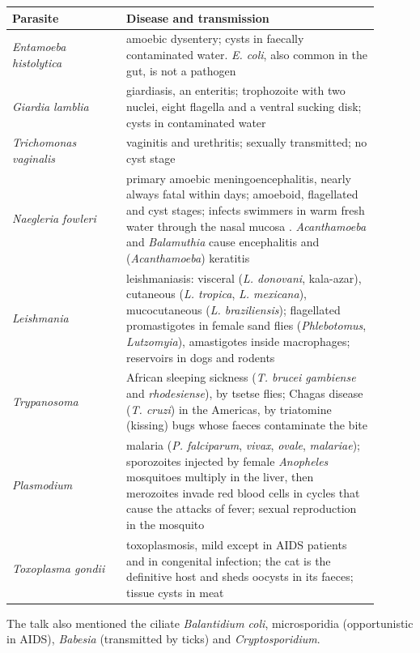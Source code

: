 \begin{center}
\begin{tabular}{p{0.28\linewidth}
p{0.62\linewidth}}
Parasite & Disease and transmission \\
\hline
\emph{Entamoeba histolytica} & amoebic
dysentery; cysts in faecally contaminated
water. \emph{E. coli}, also common in the
gut, is not a pathogen \\
\emph{Giardia lamblia} & giardiasis, an
enteritis; trophozoite with two nuclei, eight
flagella and a ventral sucking disk; cysts in
contaminated water \\
\emph{Trichomonas vaginalis} & vaginitis and
urethritis; sexually transmitted; no cyst
stage \\
\emph{Naegleria fowleri} & primary amoebic
meningoencephalitis, nearly always fatal
within days; amoeboid, flagellated and cyst
stages; infects swimmers in warm fresh water
through the nasal mucosa \cite[Chapter
22]{tortora2013microbiology}.
\emph{Acanthamoeba} and \emph{Balamuthia}
cause encephalitis and (\emph{Acanthamoeba})
keratitis \\
\emph{Leishmania} & leishmaniasis: visceral
(\emph{L. donovani}, kala-azar), cutaneous
(\emph{L. tropica}, \emph{L. mexicana}),
mucocutaneous (\emph{L. braziliensis});
flagellated promastigotes in female sand
flies (\emph{Phlebotomus}, \emph{Lutzomyia}),
amastigotes inside macrophages; reservoirs in
dogs and rodents \\
\emph{Trypanosoma} & African sleeping
sickness (\emph{T. brucei gambiense} and
\emph{rhodesiense}), by tsetse flies; Chagas
disease (\emph{T. cruzi}) in the Americas, by
triatomine (kissing) bugs whose faeces
contaminate the bite \\
\emph{Plasmodium} & malaria (\emph{P.
falciparum}, \emph{vivax}, \emph{ovale},
\emph{malariae}); sporozoites injected by
female \emph{Anopheles} mosquitoes multiply
in the liver, then merozoites invade red
blood cells in cycles that cause the attacks
of fever; sexual reproduction in the mosquito
\\
\emph{Toxoplasma gondii} & toxoplasmosis,
mild except in AIDS patients and in
congenital infection; the cat is the
definitive host and sheds oocysts in its
faeces; tissue cysts in meat \\
\end{tabular}
\end{center}

The talk also mentioned the ciliate
\emph{Balantidium coli}, microsporidia
(opportunistic in AIDS), \emph{Babesia}
(transmitted by ticks) and
\emph{Cryptosporidium}.

